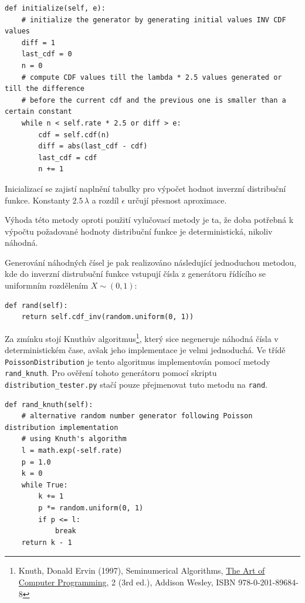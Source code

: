 \documentclass[12pt, a4paper]{article}
\begin{document}
   \begin{lstlisting}
def initialize(self, e):
    # initialize the generator by generating initial values INV CDF values
    diff = 1
    last_cdf = 0
    n = 0
    # compute CDF values till the lambda * 2.5 values generated or till the difference
    # before the current cdf and the previous one is smaller than a certain constant
    while n < self.rate * 2.5 or diff > e:
        cdf = self.cdf(n)
        diff = abs(last_cdf - cdf)
        last_cdf = cdf
        n += 1
   \end{lstlisting}

    Inicializací se zajistí naplnění tabulky pro výpočet hodnot inverzní distribuční funkce. Konstanty $2.5\, \lambda$ a
    rozdíl $\epsilon$ určují přesnost aproximace.

    Výhoda této metody oproti použití vylučovací metody je ta, že doba potřebná k výpočtu požadované hodnoty distribuční funkce je
    deterministická, nikoliv náhodná.

    Generování náhodných čísel je pak realizováno následující jednoduchou metodou, kde do inverzní distrubuční funkce vstupují
    čísla z generátoru řídícího se uniformním rozdělením $X \sim (0, 1)$:

    \begin{lstlisting}
def rand(self):
    return self.cdf_inv(random.uniform(0, 1))
    \end{lstlisting}

    Za zmínku stojí Knuthův algoritmus\footnote{Knuth, Donald Ervin (1997), Seminumerical Algorithms, \hyperlink{https://en.wikipedia.org/wiki/The\_Art\_of\_Computer\_Programming}{The Art of Computer Programming}, 2 (3rd ed.), Addison Wesley, ISBN 978-0-201-89684-8}, který sice negeneruje náhodná čísla v deterministickém čase, avšak jeho implementace
    je velmi jednoduchá. Ve třídě \texttt{PoissonDistribution} je tento algoritmus implementován pomocí metody \texttt{rand\_knuth}.
    Pro ověření tohoto generátoru pomocí skriptu \texttt{distribution_tester.py} stačí pouze přejmenovat tuto metodu na \texttt{rand}.

    \pagebreak

    \begin{lstlisting}
def rand_knuth(self):
    # alternative random number generator following Poisson distribution implementation
    # using Knuth's algorithm
    l = math.exp(-self.rate)
    p = 1.0
    k = 0
    while True:
        k += 1
        p *= random.uniform(0, 1)
        if p <= l:
            break
    return k - 1
    \end{lstlisting}
\end{document}
